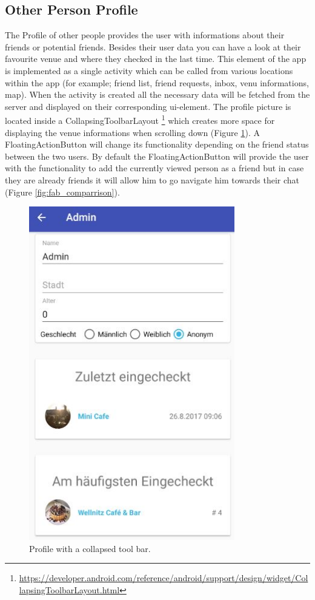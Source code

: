 \subsection{Other Person Profile}
The Profile of other people provides the user with informations about their friends or potential friends. Besides their user data you can have a look at their favourite venue and where they checked in the last time. This element of the app is implemented as a single activity which can be called from various locations within the app (for example; friend list, friend requests, inbox, venu informations, map). When the activity is created all the necessary data will be fetched from the server and displayed on their corresponding ui-element. The profile picture is located inside a CollapsingToolbarLayout \footnote{\url{https://developer.android.com/reference/android/support/design/widget/CollapsingToolbarLayout.html}} which creates more space for displaying the venue informations when scrolling down (Figure \ref{fig:profile_activity_two}). A FloatingActionButton will change its functionality depending on the friend status between the two users. By default the FloatingActionButton will provide the user with the functionality to add the currently viewed person as a friend but in case they are already friends it will allow him to go navigate him towards their chat (Figure \ref{fig:fab_comparrison}).
\begin{figure}[htbp]
	\includegraphics[width=0.8\textwidth]{images/profile_activity_two.jpg}
	\centering
	\caption{Profile with a collapsed tool bar.}\label{fig:profile_activity_two}
\end{figure} 
